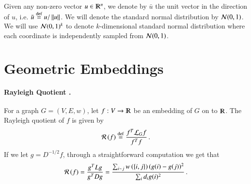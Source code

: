 \documentclass[11pt]{article}
\newcommand{\Pnote}{\Authornote{Prasad}}
\newcommand{\mustat}{\mu^*}
\newcommand{\ralsymb}{\cR}
\newcommand{\ral}[1]{\ralsymb\left(#1\right)} %
\begin{document}

%
Given any non-zero vector $u \in \R^n$, we denote by $\bar{u}$ the unit vector in the direction of $u$, i.e.
$\bar{u} \stackrel{\textup{def}}{=} u/\left\lVert u\right\rVert$.
%
We will denote the standard normal distribution by $\mathcal N(0,1)$. We will use
$\mathcal N(0,1)^k$ to denote $k$-dimensional standard normal distribution where each
coordinate is independently sampled from $\mathcal N(0,1)$.



\section{Geometric Embeddings}

\paragraph{Rayleigh Quotient .}
For a graph $G = (V,E,w)$, let  $f: V \to \R$ be an embedding of $G$ on to $\R$.
%
The Rayleigh quotient of $f$ is given by 
\[ \ral{f} \defeq \frac{f^T \cL_G f}{f^T f}  \mper  \]
%
If we let $g = D^{- 1/2} f$, through a straightforward computation we get that
\[ \ral{f} = \frac{g^T L g}{ g^T D g} = \frac{\sum_{i \sim j} w
	\paren{\set{ i,j}} (g(i) - g(j))^2  }{\sum_i d_i g(i)^2} \mper \]
%
\end{document}
